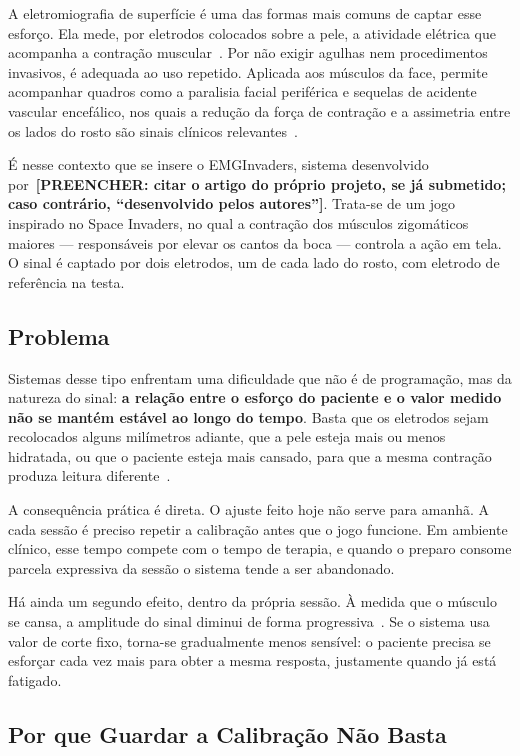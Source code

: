 A eletromiografia de superfície é uma das formas mais comuns de captar
esse esforço. Ela mede, por eletrodos colocados sobre a pele, a
atividade elétrica que acompanha a contração
muscular~\cite{ref:semg_fundamentos}. Por não exigir agulhas nem
procedimentos invasivos, é adequada ao uso repetido. Aplicada aos
músculos da face, permite acompanhar quadros como a paralisia facial
periférica e sequelas de acidente vascular encefálico, nos quais a
redução da força de contração e a assimetria entre os lados do rosto
são sinais clínicos relevantes~\cite{ref:semg_facial_clinico}.

É nesse contexto que se insere o EMGInvaders, sistema desenvolvido
por~\textbf{[PREENCHER: citar o artigo do próprio projeto, se já
submetido; caso contrário, ``desenvolvido pelos autores'']}. Trata-se
de um jogo inspirado no Space Invaders, no qual a contração dos
músculos zigomáticos maiores --- responsáveis por elevar os cantos da
boca --- controla a ação em tela. O sinal é captado por dois eletrodos,
um de cada lado do rosto, com eletrodo de referência na testa.

\subsection{Problema}

Sistemas desse tipo enfrentam uma dificuldade que não é de programação,
mas da natureza do sinal: \textbf{a relação entre o esforço do paciente
e o valor medido não se mantém estável ao longo do tempo}. Basta que os
eletrodos sejam recolocados alguns milímetros adiante, que a pele
esteja mais ou menos hidratada, ou que o paciente esteja mais cansado,
para que a mesma contração produza leitura
diferente~\cite{ref:variabilidade_intersessao}.

A consequência prática é direta. O ajuste feito hoje não serve para
amanhã. A cada sessão é preciso repetir a calibração antes que o jogo
funcione. Em ambiente clínico, esse tempo compete com o tempo de
terapia, e quando o preparo consome parcela expressiva da sessão o
sistema tende a ser abandonado.

Há ainda um segundo efeito, dentro da própria sessão. À medida que o
músculo se cansa, a amplitude do sinal diminui de forma
progressiva~\cite{ref:fadiga_semg}. Se o sistema usa valor de corte
fixo, torna-se gradualmente menos sensível: o paciente precisa se
esforçar cada vez mais para obter a mesma resposta, justamente quando
já está fatigado.

\subsection{Por que Guardar a Calibração Não Basta}

